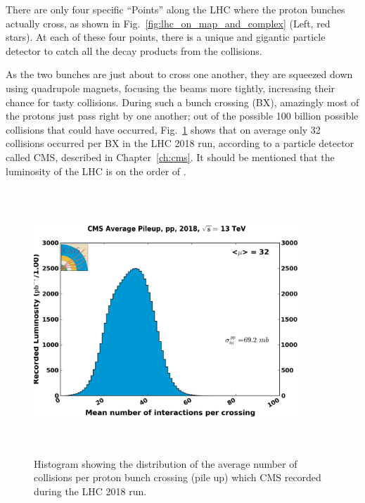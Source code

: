 There are only four specific ``Points'' along the LHC where the proton bunches actually cross, as shown in Fig.~\ref{fig:lhc_on_map_and_complex} (Left, red stars).
At each of these four points, there is a unique and gigantic particle detector to catch all the decay products from the \pp collisions. 

As the two bunches are just about to cross one another, they are squeezed down using quadrupole magnets, focusing the beams more tightly, increasing their chance for tasty \pp collisions.
During such a bunch crossing (BX), amazingly most of the protons just pass right by one another; 
out of the possible 100 billion possible collisions that could have occurred, Fig.~\ref{plt:pileup} shows that on average only 32 collisions occurred per BX in the LHC 2018 run, according to a particle detector called CMS, described in Chapter~\ref{ch:cms}.
It should be mentioned that the luminosity of the LHC is on the order of \LHigh. %
\begin{figure}[pbth]
\centering
\includegraphics[width=10cm,height=10cm,keepaspectratio]{figures/lhc/pileup_pp_2018.png}
    \caption{Histogram showing the distribution of the average number of \pp collisions per proton bunch crossing (pile up) which CMS recorded during the LHC 2018 run.} 
    \label{plt:pileup}
\end{figure}

